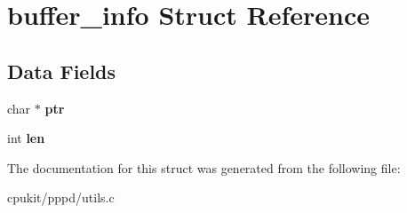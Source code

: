 \hypertarget{structbuffer__info}{}\section{buffer\+\_\+info Struct Reference}
\label{structbuffer__info}
\subsection*{Data Fields}
\begin{DoxyCompactItemize}
\item 
\mbox{\label{structbuffer__info_a7fba22bed8b9c54f9e1ba29c2249e6a7}} 
char $\ast$ {\bfseries ptr}
\item 
\mbox{\label{structbuffer__info_ad76309da5b33daa050037dd812126f3e}} 
int {\bfseries len}
\end{DoxyCompactItemize}


The documentation for this struct was generated from the following file\+:\begin{DoxyCompactItemize}
\item 
cpukit/pppd/utils.\+c\end{DoxyCompactItemize}
